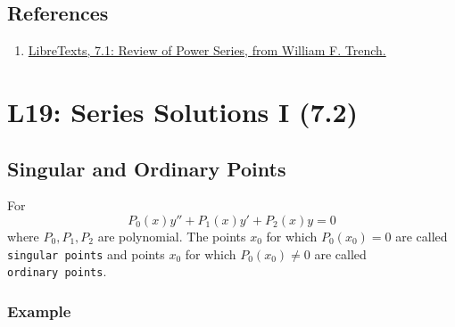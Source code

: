 \documentclass[
  letterpaper,
  DIV=11,
  numbers=noendperiod]{scrreprt}
\providecommand{\tightlist}{%
  \setlength{\itemsep}{0pt}\setlength{\parskip}{0pt}}
\theoremstyle{plain}
\theoremstyle{remark}
\begin{document}
\section{References}\label{references}

\begin{enumerate}
\def\labelenumi{\arabic{enumi}.}
\tightlist
\item
  \href{https://math.libretexts.org/Courses/Monroe_Community_College/MTH_225_Differential_Equations/7\%3A_Series_Solutions_of_Linear_Second_Order_Equations/7.1\%3A_Review_of_Power_Series}{LibreTexts,
  7.1: Review of Power Series, from William F. Trench.}
\end{enumerate}


\chapter{L19: Series Solutions I
(7.2)}\label{l19-series-solutions-i-7.2-1}

\section{Singular and Ordinary
Points}\label{singular-and-ordinary-points}

\begin{tcolorbox}[enhanced jigsaw, title=\textcolor{quarto-callout-note-color}{\faInfo}\hspace{0.5em}{Definition}, colbacktitle=quarto-callout-note-color!10!white, opacitybacktitle=0.6, opacityback=0, rightrule=.15mm, breakable, titlerule=0mm, colback=white, bottomtitle=1mm, colframe=quarto-callout-note-color-frame, toprule=.15mm, leftrule=.75mm, toptitle=1mm, arc=.35mm, bottomrule=.15mm, left=2mm, coltitle=black]

For \[P_0(x)y''+P_1(x)y'+P_2(x)y=0\] where \(P_0,P_1,P_2\) are
polynomial. The points \(x_0\) for which \(P_0(x_0)=0\) are called
\texttt{singular\ points} and points \(x_0\) for which
\(P_0(x_0)\neq 0\) are called \texttt{ordinary\ points}.

\end{tcolorbox}

\subsection{Example}\label{example-6}
\end{document}

